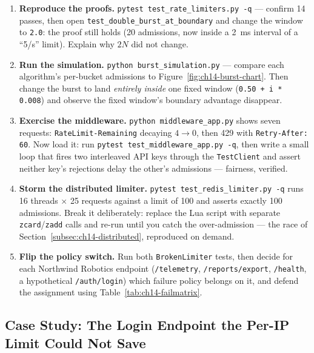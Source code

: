 \begin{enumerate}
  \item \textbf{Reproduce the proofs.} \texttt{pytest test\_rate\_limiters.py -q}
        --- confirm 14 passes, then open
        \texttt{test\_double\_burst\_at\_boundary} and change the window to
        \texttt{2.0}: the proof still holds (20 admissions, now inside a
        2~ms interval of a ``5/s'' limit). Explain why $2N$ did not change.
  \item \textbf{Run the simulation.} \texttt{python burst\_simulation.py} ---
        compare each algorithm's per-bucket admissions to
        Figure~\ref{fig:ch14-burst-chart}. Then change the burst to land
        \emph{entirely inside} one fixed window (\texttt{0.50 + i * 0.008})
        and observe the fixed window's boundary advantage disappear.
  \item \textbf{Exercise the middleware.} \texttt{python middleware\_app.py}
        shows seven requests: \texttt{RateLimit-Remaining} decaying
        $4 \to 0$, then 429 with \texttt{Retry-After: 60}. Now load it: run
        \texttt{pytest test\_middleware\_app.py -q}, then write a small
        loop that fires two interleaved API keys through the
        \texttt{TestClient} and assert neither key's rejections delay the
        other's admissions --- fairness, verified.
  \item \textbf{Storm the distributed limiter.}
        \texttt{pytest test\_redis\_limiter.py -q} runs 16 threads
        $\times$ 25 requests against a limit of 100 and asserts exactly 100
        admissions. Break it deliberately: replace the Lua script with
        separate \texttt{zcard}/\texttt{zadd} calls and re-run until you
        catch the over-admission --- the race of
        Section~\ref{subsec:ch14-distributed}, reproduced on demand.
  \item \textbf{Flip the policy switch.} Run both \texttt{BrokenLimiter}
        tests, then decide for each Northwind Robotics endpoint
        (\texttt{/telemetry}, \texttt{/reports/export}, \texttt{/health},
        a hypothetical \texttt{/auth/login}) which failure policy belongs on
        it, and defend the assignment using
        Table~\ref{tab:ch14-failmatrix}.
\end{enumerate}

\subsection{Case Study: The Login Endpoint the Per-IP Limit Could Not Save}
\label{sec:ch14-case}

